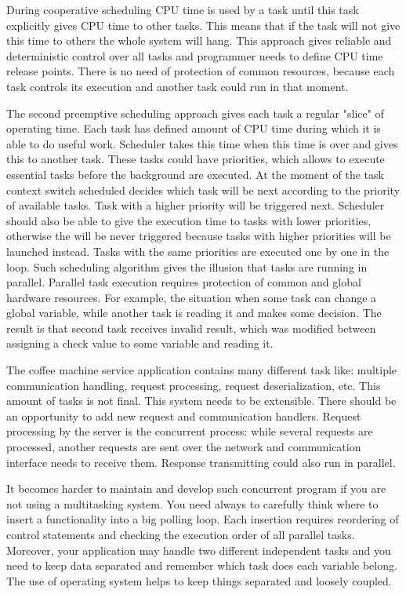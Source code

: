 During cooperative scheduling CPU time is used by a task until this task explicitly gives CPU time to other tasks.
This means that if the task will not give this time to others the whole system will hang.
This approach gives reliable and deterministic control over all tasks  and programmer needs to define CPU time release points.
There is no need of protection of common resources, because each task controls its execution and another task could run in that moment.

The second preemptive scheduling approach gives each task a regular "slice" of operating time. 
Each task has defined amount of CPU time during which it is able to do useful work.
Scheduler takes this time when this time is over and gives this to another task.
These tasks could have priorities, which allows to execute essential tasks before the background are executed.
At the moment of the task context switch scheduled decides which task will be next according to the priority of available tasks.
Task with a higher priority will be triggered next. 
Scheduler should also be able to give the execution time to tasks with lower priorities, otherwise the will be never triggered because tasks with higher priorities will be launched instead.
Tasks with the same priorities are executed one by one in the loop\cite{barry2010using}.
Such scheduling algorithm gives the illusion that tasks are running in parallel.
Parallel task execution requires protection of common and global hardware resources. 
For example, the situation when some task can change a global variable, while another task is reading it and makes some decision.
The result is that second task receives invalid result, which was modified between assigning a check value to some variable and reading it.


The coffee machine service application contains many different task like: 
multiple communication handling,
request processing,
request deserialization, etc.
This amount of tasks is not final.
This system needs to be extensible.
There should be an opportunity to add new request and communication handlers.
Request processing by the server is the concurrent process: while several requests are processed, another requests are sent over the network and communication interface needs to receive them.
Response transmitting could also run in parallel.

It becomes harder to maintain and develop such concurrent program if you are not using a multitasking system. 
You need always to carefully think where to insert a functionality into a big polling loop.
Each insertion requires reordering of control statements and checking the execution order of all parallel tasks.
Moreover, your application may handle two different independent tasks and you need to keep data separated and remember which task does each variable belong.
The use of operating system helps to keep things separated and loosely coupled.
 
